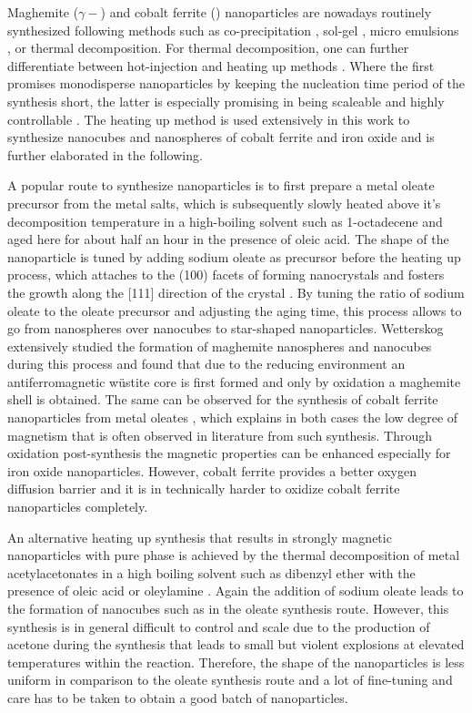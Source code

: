 \documentclass[\main/dresen_thesis.tex]{subfiles}
\begin{document}
  Maghemite ($\gamma-$) and cobalt ferrite () nanoparticles are nowadays routinely synthesized following methods such as co-precipitation \cite{Fried_2001_Order}, sol-gel \cite{Niederberger_2009_Metal}, micro emulsions \cite{Pillai_1996_Synth}, or thermal decomposition.
  For thermal decomposition, one can further differentiate between hot-injection \cite{Hyeon_2003_Chemi} and heating up methods \cite{Embden_2015_TheHe}.
  Where the first promises monodisperse nanoparticles by keeping the nucleation time period of the synthesis short, the latter is especially promising in being scaleable and highly controllable \cite{Park_2004_Ultra}.
  The heating up method is used extensively in this work to synthesize nanocubes and nanospheres of cobalt ferrite and iron oxide and is further elaborated in the following.

  A popular route to synthesize nanoparticles is to first prepare a metal oleate precursor from the metal salts, which is subsequently slowly heated above it's decomposition temperature in a high-boiling solvent such as 1-octadecene and aged here for about half an hour in the presence of oleic acid.
  The shape of the nanoparticle is tuned by adding sodium oleate as precursor before the heating up process, which attaches to the (100) facets of forming nanocrystals and fosters the growth along the [111] direction of the crystal \cite{Bao_2009_Forma}.
  By tuning the ratio of sodium oleate to the oleate precursor and adjusting the aging time, this process allows to go from nanospheres over nanocubes to star-shaped nanoparticles.
  Wetterskog \etal extensively studied the formation of maghemite nanospheres and nanocubes during this process \cite{Wetterskog_2014_Preci, Wetterskog_2013_Anoma} and found that due to the reducing environment an antiferromagnetic w\"ustite core is first formed and only by oxidation a maghemite shell is obtained.
  The same can be observed for the synthesis of cobalt ferrite nanoparticles from metal oleates \cite{Bodnarchuk_2009_Excha}, which explains in both cases the low degree of magnetism that is often observed in literature from such synthesis.
  Through oxidation post-synthesis the magnetic properties can be enhanced especially for iron oxide nanoparticles.
  However, cobalt ferrite provides a better oxygen diffusion barrier \cite{Chen_2015_Synth} and it is in technically harder to oxidize cobalt ferrite nanoparticles completely.

  An alternative heating up synthesis that results in strongly magnetic nanoparticles with pure phase is achieved by the thermal decomposition of metal acetylacetonates in a high boiling solvent such as dibenzyl ether with the presence of oleic acid or oleylamine \cite{Sun_2002_SizeC, Wu_2014_Monol}.
  Again the addition of sodium oleate leads to the formation of nanocubes such as in the oleate synthesis route.
  However, this synthesis is in general difficult to control and scale due to the production of acetone during the synthesis that leads to small but violent explosions at elevated temperatures within the reaction.
  Therefore, the shape of the nanoparticles is less uniform in comparison to the oleate synthesis route and a lot of fine-tuning and care has to be taken to obtain a good batch of nanoparticles.
\end{document}
